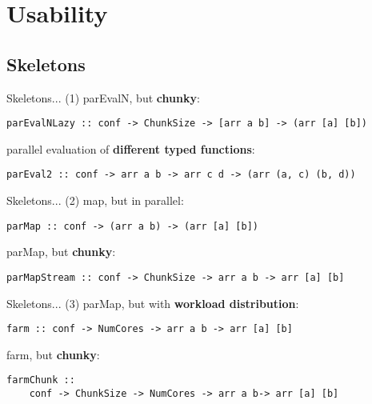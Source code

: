 \section{Usability}
\subsection{Skeletons}
\begin{frame}[fragile]{Skeletons... (1)}
parEvalN, but \textbf{chunky}:
\begin{lstlisting}[frame=htrbl]
parEvalNLazy :: conf -> ChunkSize -> [arr a b] -> (arr [a] [b])
\end{lstlisting}
parallel evaluation of \textbf{different typed functions}:
\begin{lstlisting}[frame=htrbl]
parEval2 :: conf -> arr a b -> arr c d -> (arr (a, c) (b, d))
\end{lstlisting}
\end{frame}
\begin{frame}[fragile]{Skeletons... (2)}
map, but in  parallel:
\begin{lstlisting}[frame=htrbl]
parMap :: conf -> (arr a b) -> (arr [a] [b])
\end{lstlisting}
parMap, but \textbf{chunky}:
\begin{lstlisting}[frame=htrbl]
parMapStream :: conf -> ChunkSize -> arr a b -> arr [a] [b]
\end{lstlisting}
\end{frame}
\begin{frame}[fragile]{Skeletons... (3)}
parMap, but with \textbf{workload distribution}:
\begin{lstlisting}[frame=htrbl]
farm :: conf -> NumCores -> arr a b -> arr [a] [b]
\end{lstlisting}
farm, but \textbf{chunky}:
\begin{lstlisting}[frame=htrbl]
farmChunk ::
	conf -> ChunkSize -> NumCores -> arr a b-> arr [a] [b]
\end{lstlisting}
\end{frame}